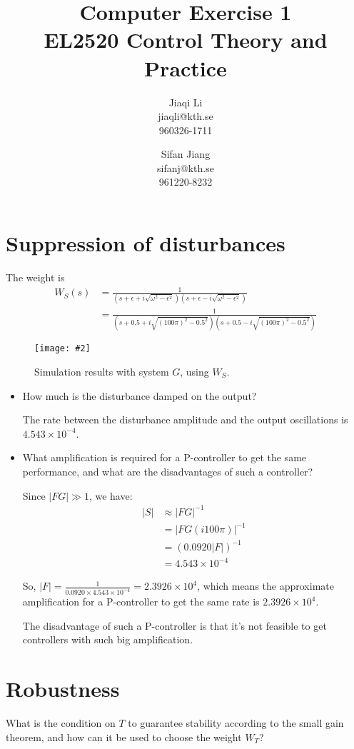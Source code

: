 \documentclass[11pt,a4paper]{article}
\title{
	Computer Exercise 1\\
	EL2520 Control Theory and Practice
}
\author{
	Jiaqi Li\\
	jiaqli@kth.se\\
	960326-1711
	\and
	Sifan Jiang\\
	sifanj@kth.se\\
	961220-8232
}
\newcommand{\image}[3]{
	\begin{figure}[!ht]
		\centering
	    \texttt{[image: \#2]}
		\caption{#3}
		\label{fig:#2}
	\end{figure}
}
\begin{document}
\maketitle


\section*{Suppression of disturbances}
\par The weight is
	\begin{align*}
		W_S(s) &= \frac{1}{(s+\epsilon+i\sqrt{\omega^{2}-\epsilon^{2}})(s+\epsilon-i\sqrt{\omega^{2}-\epsilon^{2}})} \\
		&= \frac{1}{(s+0.5+i\sqrt{(100\pi)^{2}-0.5^{2}})(s+0.5-i\sqrt{(100\pi)^{2}-0.5^{2}})}
	\end{align*}

	\image{1}{41}{Simulation results with system $G$, using $W_S$.}
	
	\begin{itemize}
		\item How much is the disturbance damped on the output?
		\par The rate between the disturbance amplitude and the output oscillations is $4.543\times 10^{-4}$.

		\item What amplification is required for a P-controller to get the same performance, and what are the disadvantages of such a controller?
		\par Since $|FG| \gg 1$, we have:
			\begin{align*}
				|S| &\approx |FG|^{-1} \\
				&= |FG(i 100\pi)|^{-1} \\
				&= (0.0920|F|)^{-1} \\
				&= 4.543\times 10^{-4}
			\end{align*}
		\par So, $|F|=\frac{1}{0.0920\times4.543\times 10^{-4}}=2.3926\times10^{4}$, which means the approximate amplification for a P-controller to get the same rate is $2.3926\times10^{4}$.
		\par The disadvantage of such a P-controller is that it's not feasible to get controllers with such big amplification.
	\end{itemize}


\section*{Robustness}
\par What is the condition on $T$ to guarantee stability according to the small gain theorem, and how can it be used to choose the weight $W_T$?
\par\dotfill\par\dotfill\par
\end{document}
